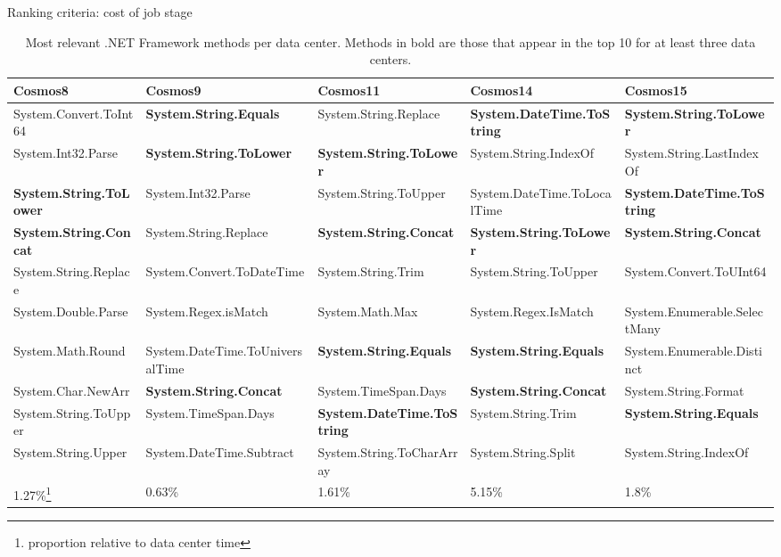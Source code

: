 Ranking criteria: cost of job stage
\begin{table}[ht]
\small
 \begin{tabular}{@{}llllp{3.5cm}@{}}

  Cosmos8 & Cosmos9 & Cosmos11 & Cosmos14 & Cosmos15 \\
 \midrule
System.Convert.ToInt64 & \textbf{System.String.Equals} & System.String.Replace & \textbf{System.DateTime.ToString} & \textbf{System.String.ToLower} \\
System.Int32.Parse & \textbf{System.String.ToLower} & \textbf{System.String.ToLower} & System.String.IndexOf & System.String.LastIndexOf \\
\textbf{System.String.ToLower} & System.Int32.Parse & System.String.ToUpper & System.DateTime.ToLocalTime & \textbf{System.DateTime.ToString}\\
\textbf{System.String.Concat} & System.String.Replace & \textbf{System.String.Concat} & \textbf{System.String.ToLower} & \textbf{System.String.Concat}\\
System.String.Replace & System.Convert.ToDateTime & System.String.Trim & System.String.ToUpper & System.Convert.ToUInt64 \\
System.Double.Parse & System.Regex.isMatch & System.Math.Max & System.Regex.IsMatch & System.Enumerable.SelectMany \\
System.Math.Round& System.DateTime.ToUniversalTime & \textbf{System.String.Equals} & \textbf{System.String.Equals} & System.Enumerable.Distinct \\
System.Char.NewArr & \textbf{System.String.Concat} & System.TimeSpan.Days & \textbf{System.String.Concat} & System.String.Format \\
System.String.ToUpper & System.TimeSpan.Days & \textbf{System.DateTime.ToString} & System.String.Trim & \textbf{System.String.Equals}\\
System.String.Upper & System.DateTime.Subtract & System.String.ToCharArray & System.String.Split & System.String.IndexOf \\

\midrule
1.27\%\footnote{proportion relative to data center time} & 0.63\% & 1.61\% & 5.15\% & 1.8\%\\
\midrule

\end{tabular}
 \label{tb:projects}
\caption{Most relevant .NET Framework methods per data center. Methods in bold are those that appear in the top 10 for at least three data centers.}
\end{table}

